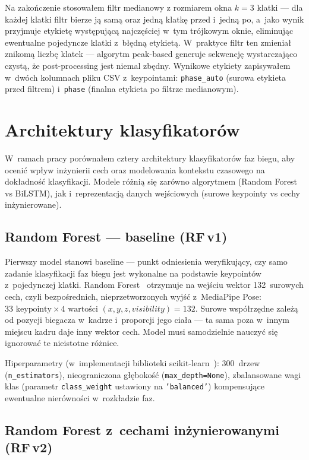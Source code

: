 Na zakończenie stosowałem filtr medianowy z rozmiarem okna $k = 3$ klatki --- dla każdej klatki filtr bierze ją samą oraz jedną klatkę przed i~jedną po, a~jako wynik przyjmuje etykietę występującą najczęściej w~tym trójkowym oknie, eliminując ewentualne pojedyncze klatki z~błędną etykietą. W~praktyce filtr ten zmieniał znikomą liczbę klatek --- algorytm peak-based generuje sekwencję wystarczająco czystą, że post-processing jest niemal zbędny. Wynikowe etykiety zapisywałem w~dwóch kolumnach pliku CSV z~keypointami: \texttt{phase\_auto} (surowa etykieta przed filtrem) i~\texttt{phase} (finalna etykieta po filtrze medianowym).

\section{Architektury klasyfikatorów}
\label{sec:architektury}

W~ramach pracy porównałem cztery architektury klasyfikatorów faz biegu, aby ocenić wpływ inżynierii cech oraz modelowania kontekstu czasowego na dokładność klasyfikacji. Modele różnią się zarówno algorytmem (Random Forest vs BiLSTM), jak i~reprezentacją danych wejściowych (surowe keypointy vs cechy inżynierowane).

\subsection{Random Forest --- baseline (RF\,v1)}
\label{sec:rf-v1}

Pierwszy model stanowi baseline --- punkt odniesienia weryfikujący, czy samo zadanie klasyfikacji faz biegu jest wykonalne na podstawie keypointów z~pojedynczej klatki. Random Forest~\cite{breiman2001rf} otrzymuje na wejściu wektor 132~surowych cech, czyli bezpośrednich, nieprzetworzonych wyjść z~MediaPipe Pose: $33 \text{ keypointy} \times 4 \text{ wartości } (x, y, z, visibility) = 132$. Surowe współrzędne zależą od pozycji biegacza w~kadrze i~proporcji jego ciała --- ta sama poza w~innym miejscu kadru daje inny wektor cech. Model musi samodzielnie nauczyć się ignorować te nieistotne różnice.

Hiperparametry (w~implementacji biblioteki scikit-learn~\cite{sklearn}): 300~drzew (\texttt{n\_estimators}), nieograniczona głębokość (\texttt{max\_depth=None}), zbalansowane wagi klas (parametr \texttt{class\_weight} ustawiony na \texttt{'balanced'}) kompensujące ewentualne nierówności w~rozkładzie faz.

\subsection{Random Forest z~cechami inżynierowanymi (RF\,v2)}
\label{sec:rf-v2}

